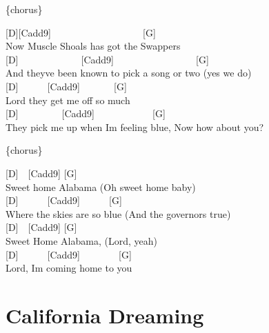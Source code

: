 \documentclass[
  letterpaper,
]{scrbook}
\begin{document}
\{chorus\}

{[}D{]}{[}Cadd9{]}~~~~~~~~~~~~~~~~~~~{[}G{]}\\
Now Muscle Shoals has got the Swappers\\
{[}D{]}~~~~~~~~~~~~~{[}Cadd9{]}~~~~~~~~~~~~~~~~~{[}G{]}\\
And they\textquotesingle ve been known to pick a song or two (yes we
do)\\
{[}D{]}~~~~~~{[}Cadd9{]}~~~~~~~{[}G{]}\\
Lord they get me off so much\\
{[}D{]}~~~~~~~~~{[}Cadd9{]}~~~~~~~~~~~~{[}G{]}~~~\\
They pick me up when I\textquotesingle m feeling blue, Now how about
you?

\{chorus\}

{[}D{]}~~{[}Cadd9{]} {[}G{]}~~~~~\\
Sweet home Alabama (Oh sweet home baby)\\
{[}D{]}~~~~~~{[}Cadd9{]}~~~~~~{[}G{]}~~~\\
Where the skies are so blue (And the governor\textquotesingle s true)\\
{[}D{]}~~{[}Cadd9{]} {[}G{]}\\
Sweet Home Alabama, (Lord, yeah)\\
{[}D{]}~~~~~~{[}Cadd9{]}~~~~~~~~{[}G{]}\\
Lord, I\textquotesingle m coming home to you

\hypertarget{california-dreaming}{%
\chapter{California Dreaming}\label{california-dreaming}}
\end{document}
